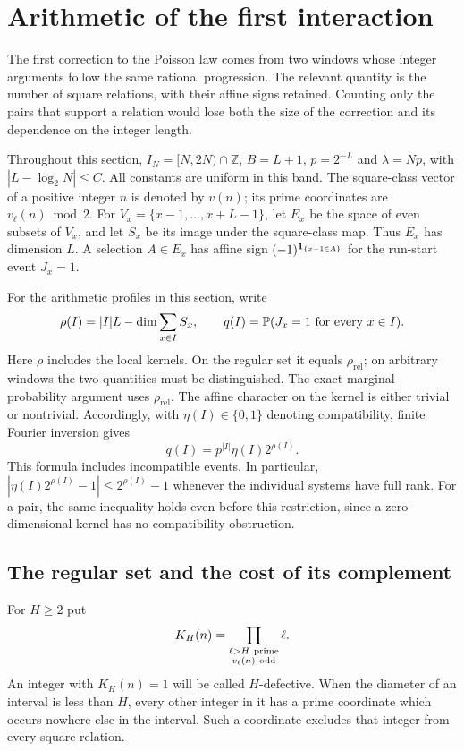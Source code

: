 \section{Arithmetic of the first interaction}
\label{p1:arith:section}

The first correction to the Poisson law comes from two windows whose integer
arguments follow the same rational progression.  The relevant quantity is the
number of square relations, with their affine signs retained.  Counting only
the pairs that support a relation would lose both the size of the correction
and its dependence on the integer length.

Throughout this section, $I_N=[N,2N)\cap\mathbb Z$, $B=L+1$,
$p=2^{-L}$ and $\lambda=Np$, with $|L-\log_2N|\leq C$.
All constants are uniform in this band.  The square-class vector of a positive
integer $n$ is denoted by $v(n)$; its prime coordinates are $v_\ell(n)\bmod2$.
For $V_x=\{x-1,\ldots,x+L-1\}$, let $E_x$ be the space of even subsets of
$V_x$, and let $S_x$ be its image under the square-class map.  Thus $E_x$ has
dimension $L$.  A selection $A\in E_x$ has affine sign
$(-1)^{\ind_{\{x-1\in A\}}}$ for the run-start event $J_x=1$.

For the arithmetic profiles in this section, write
\[
 \rho(I)=|I|L-\dim\sum_{x\in I}S_x,\qquad
 q(I)=\P(J_x=1\text{ for every }x\in I).
\]
Here $\rho$ includes the local kernels. On the regular set it equals
$\rho_{\mathrm{rel}}$; on arbitrary windows the two quantities must be
distinguished. The exact-marginal probability argument uses
$\rho_{\mathrm{rel}}$.
The affine character on the kernel is either trivial or nontrivial.  Accordingly,
with $\eta(I)\in\{0,1\}$ denoting compatibility, finite Fourier inversion gives
\begin{equation}\label{p1:arith:affine}
 q(I)=p^{|I|}\eta(I)2^{\rho(I)}.
\end{equation}
This formula includes incompatible events.  In particular,
$|\eta(I)2^{\rho(I)}-1|\leq2^{\rho(I)}-1$ whenever the individual systems
have full rank.  For a pair, the same inequality holds even before this
restriction, since a zero-dimensional kernel has no compatibility obstruction.

\subsection{The regular set and the cost of its complement}

For $H\geq2$ put
\[
 K_H(n)=\prod_{\substack{\ell>H\ {\rm prime}\\v_\ell(n)\ {\rm odd}}}\ell.
\]
An integer with $K_H(n)=1$ will be called $H$-defective.  When the diameter of
an interval is less than $H$, every other integer in it has a prime coordinate
which occurs nowhere else in the interval.  Such a coordinate excludes that
integer from every square relation.

